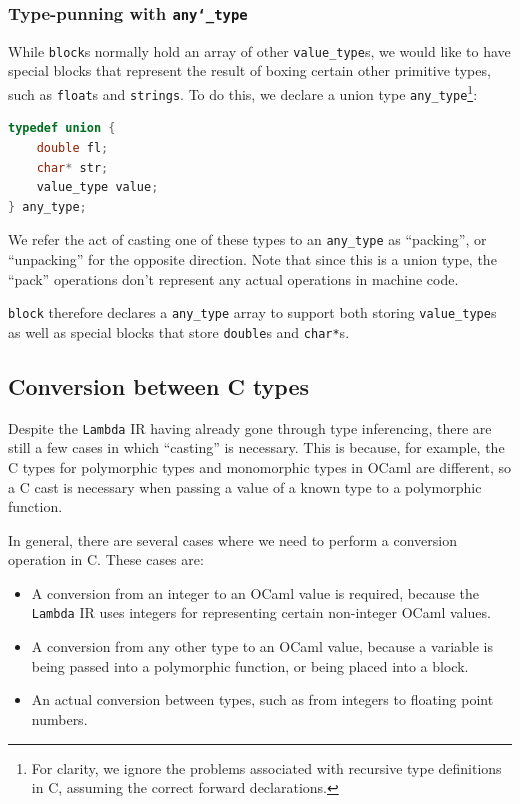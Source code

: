 \subsubsection{Type-punning with \texttt{any\char`_type}}

While \texttt{block}s normally hold an array of other \verb|value_type|s, we
would like to have special blocks that represent the result of boxing certain
other primitive types, such as \texttt{float}s and \texttt{strings}. To do this,
we declare a union type \verb|any_type|\footnote{For clarity, we ignore the
problems associated with recursive type definitions in C, assuming the correct
forward declarations.}:

\begin{lstlisting}[language=C]
typedef union {
    double fl;
    char* str;
    value_type value;
} any_type;
\end{lstlisting}

We refer the act of casting one of these types to an \verb|any_type| as
``packing'', or ``unpacking'' for the opposite direction. Note that since this
is a union type, the ``pack'' operations don't represent any actual operations
in machine code.

\texttt{block} therefore declares a \verb|any_type| array to support both
storing \verb|value_type|s as well as special blocks that store \verb|double|s
and \verb|char*|s.

\subsection{Conversion between C types} \label{casting}

Despite the \texttt{Lambda} IR having already gone through type inferencing,
there are still a few cases in which ``casting'' is necessary. This is because,
for example, the C types for polymorphic types and monomorphic types in OCaml
are different, so a C cast is necessary when passing a value of a known type to
a polymorphic function.

In general, there are several cases where we need to perform a conversion
operation in C. These cases are: 

\begin{itemize}

\item A conversion from an integer to an OCaml value is required, because the
    \texttt{Lambda} IR uses integers for representing certain non-integer OCaml
    values.

\item A conversion from any other type to an OCaml value, because a variable is
    being passed into a polymorphic function, or being placed into a block.

\item An actual conversion between types, such as from integers to floating
    point numbers.

\end{itemize}

